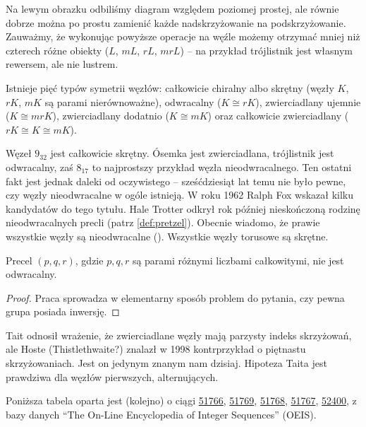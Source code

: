 Na lewym obrazku odbiliśmy diagram względem poziomej prostej,
ale równie dobrze można po prostu zamienić każde nadskrzyżowanie na podskrzyżowanie.
Zauważmy, że wykonując powyższe operacje na węźle możemy otrzymać mniej niż czterech różne obiekty
($L$, $mL$, $rL$, $mrL$) -- na przykład trójlistnik jest własnym rewersem, ale nie lustrem.

\begin{definition}
    Istnieje pięć typów symetrii węzłów:
    całkowicie chiralny albo skrętny (węzły $K$, $rK$, $mK$ są parami nierównoważne),
    odwracalny ($K \cong rK$),
    zwierciadlany ujemnie ($K \cong mrK$),
    zwierciadlany dodatnio ($K \cong mK$) oraz
    całkowicie zwierciadlany ($rK \cong K \cong mK$).
\end{definition}

Węzeł $9_{32}$ jest całkowicie skrętny.
Ósemka jest zwierciadlana, trójlistnik jest odwracalny,
zaś $8_{17}$ to najprostszy przykład węzła nieodwracalnego.
Ten ostatni fakt jest jednak daleki od oczywistego --
sześćdziesiąt lat temu nie było pewne,
czy węzły nieodwracalne w ogóle istnieją.
W roku 1962 Ralph Fox wskazał kilku kandydatów do tego tytułu.
Hale Trotter odkrył rok później nieskończoną rodzinę nieodwracalnych precli (patrz \ref{def:pretzel}).
Obecnie wiadomo, że prawie wszystkie węzły są nieodwracalne (\cite[s.~46]{murasugi96}).
Wszystkie węzły torusowe są skrętne.

\begin{proposition}[Trotter, 1963] \label{trotter}
    Precel $(p, q, r)$, gdzie $p, q, r$ są parami różnymi liczbami całkowitymi, nie jest odwracalny.
\end{proposition}

\begin{proof}
    Praca \cite{trotter63} sprowadza w elementarny sposób problem do pytania, czy pewna grupa posiada inwersję.
\end{proof}

Tait odnosił wrażenie, że zwierciadlane węzły mają parzysty indeks skrzyżowań,
ale Hoste (Thistlethwaite?) znalazł w 1998 kontrprzykład o piętnastu skrzyżowaniach.
Jest on jedynym znanym nam dzisiaj.
Hipoteza Taita jest prawdziwa dla węzłów pierwszych, alternujących.

Poniższa tabela oparta jest (kolejno) o ciągi
\href{https://oeis.org/A051766}{51766},
\href{https://oeis.org/A051769}{51769},
\href{https://oeis.org/A051768}{51768},
\href{https://oeis.org/A051767}{51767},
\href{https://oeis.org/A052400}{52400},
z bazy danych ``The On-Line Encyclopedia of Integer Sequences'' (OEIS).

